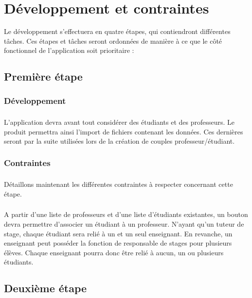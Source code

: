 \documentclass[a4paper,10pt]{report}
\begin{document}
  

  \chapter{Développement et contraintes}

    Le développement s'effectuera en quatre étapes, qui contiendront différentes tâches. Ces étapes et tâches seront ordonnées de manière à ce que le côté fonctionnel de l'application soit prioritaire :

    \section{Première étape}

      \subsection{Développement}
	\paragraph{}
	L'application devra avant tout considérer des étudiants et des professeurs.
	\newline
	Le produit permettra ainsi l'import de fichiers contenant les données. 
	Ces dernières seront par la suite utilisées lors de la création de couples professeur/étudiant. 
  
      \subsection{Contraintes}
	\paragraph{}
	Détaillons maintenant les différentes contraintes à respecter concernant cette étape. 
	\paragraph{}
	A partir d'une liste de professeurs et d'une liste d'étudiants existantes, un bouton devra permettre d'associer un étudiant à un professeur.
	N'ayant qu'un tuteur de stage, chaque étudiant sera relié à un et un seul enseignant.
	En revanche, un enseignant peut posséder la fonction de responsable de stages pour plusieurs élèves. 
	Chaque enseignant pourra donc être relié à aucun, un ou plusieurs étudiants.	
	
      
	
    \section{Deuxième étape}
\end{document}
